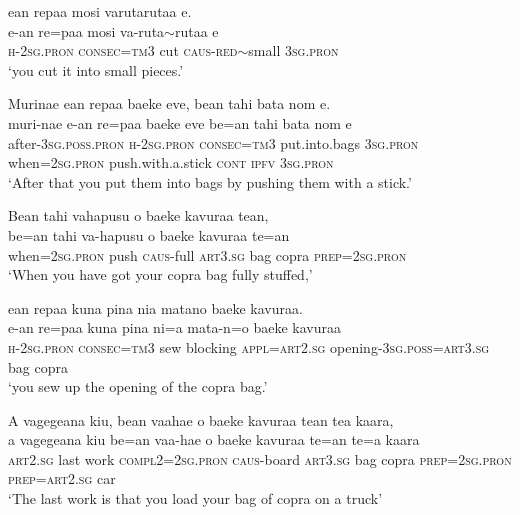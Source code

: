\ea\label{ex:text01-172}
ean repaa mosi varutarutaa e.\\
\gll e-an	re=paa	mosi	va-ruta{$\sim$}rutaa	e\\
     \textsc{h}-2\textsc{sg}.\textsc{pron}	\textsc{consec}=\textsc{tm}3	cut	\textsc{caus}-\textsc{red}{$\sim$}small	3\textsc{sg}.\textsc{pron}\\
\glt `you cut it into small pieces.'
\z

\ea\label{ex:text01-173}
Murinae ean repaa baeke eve, bean tahi bata nom e.\\
\gll muri-nae	e-an	re=paa	baeke	eve	be=an	tahi	bata	nom	e\\
     after-3\textsc{sg}.\textsc{poss}.\textsc{pron}	\textsc{h}-2\textsc{sg}.\textsc{pron}	\textsc{consec}=\textsc{tm}3	put.into.bags	3\textsc{sg}.\textsc{pron}	when=2\textsc{sg}.\textsc{pron}	push.with.a.stick	\textsc{cont}	\textsc{ipfv}	3\textsc{sg}.\textsc{pron}\\
\glt `After that you put them into bags by pushing them with a stick.'
\z

\ea\label{ex:text01-174}
Bean tahi vahapusu o baeke kavuraa tean,\\
\gll be=an	tahi	va-hapusu	o	baeke	kavuraa	te=an\\
     when=2\textsc{sg}.\textsc{pron}	push	\textsc{caus}-full	\textsc{art}3.\textsc{sg}	bag	copra	\textsc{prep}=2\textsc{sg}.\textsc{pron}\\
\glt `When you have got your copra bag fully stuffed,'
\z

\ea\label{ex:text01-175}
ean repaa kuna pina nia matano baeke kavuraa.\\
\gll e-an	re=paa	kuna	pina	ni=a	mata-n=o	baeke	kavuraa\\
     \textsc{h}-2\textsc{sg}.\textsc{pron}	\textsc{consec}=\textsc{tm}3	sew	blocking	\textsc{appl}=\textsc{art}2.\textsc{sg}	opening-3\textsc{sg}.\textsc{poss}=\textsc{art}3.\textsc{sg}	bag	copra\\
\glt `you sew up the opening of the copra bag.'
\z

\ea\label{ex:text01-176}
A vagegeana kiu, bean vaahae o baeke kavuraa tean tea kaara,\\
\gll a	vagegeana	kiu	be=an	vaa-hae	o	baeke	kavuraa	te=an	te=a	kaara\\
     \textsc{art}2.\textsc{sg}	last	work	\textsc{compl}2=2\textsc{sg}.\textsc{pron}	\textsc{caus}-board	\textsc{art}3.\textsc{sg}	bag	copra	\textsc{prep}=2\textsc{sg}.\textsc{pron}	\textsc{prep}=\textsc{art}2.\textsc{sg}	car\\
\glt `The last work is that you load your bag of copra on a truck'
\z

